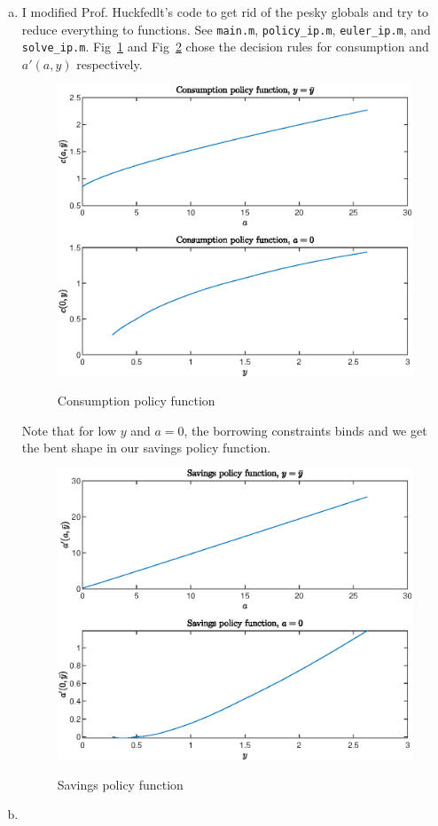 \documentclass[12pt]{article}
\newcommand{\1}{{\bf 1}} %
\begin{document}
\begin{enumerate}[(a)]
	\item
	
	I modified Prof. Huckfedlt's code to get rid of the pesky globals and try to reduce everything to functions. See \texttt{main.m}, \texttt{policy\_ip.m}, \texttt{euler\_ip.m}, and \texttt{solve\_ip.m}. Fig~\ref{fig:fig1} and Fig~\ref{fig:fig2} chose the decision rules for consumption and $a'(a,y)$ respectively. 
		\begin{figure}[H]
		\centering
		\includegraphics[width=0.7\linewidth]{fig1}
		\label{fig:fig1}
		\caption{Consumption policy function}
	\end{figure}
Note that for low $y$ and $a=0$, the borrowing constraints binds and we get the bent shape in our savings policy function. 

	\begin{figure}[H]
		\centering
		\includegraphics[width=0.7\linewidth]{fig2}
		\label{fig:fig2}
				\caption{Savings policy function}
	\end{figure}
\item




\end{enumerate}
\end{document}
